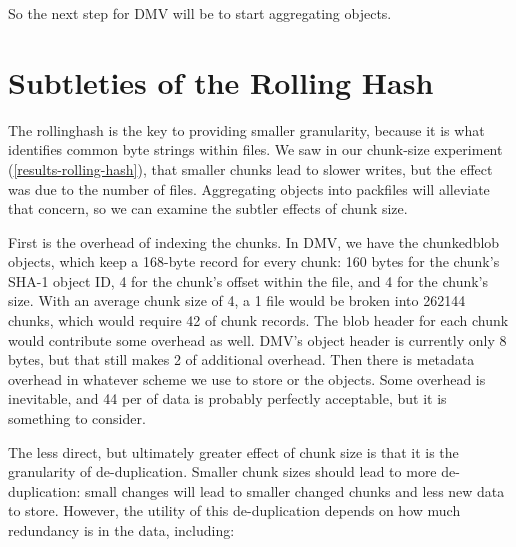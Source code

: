 So the next step for \gls{DMV} will be to start aggregating objects.

%


\section{Subtleties of the Rolling Hash}
\label{rolling-hash-subtleties}

The \gls{rollinghash} is the key to providing smaller granularity, because it is
what identifies common byte strings within files. We saw in our chunk-size
experiment (\autoref{results-rolling-hash}), that smaller chunks lead to slower
writes, but the effect was due to the number of files. Aggregating objects into
\glspl{packfile} will alleviate that concern, so we can examine the subtler
effects of chunk size.

\label{chunk-size-overhead-discussion}

First is the overhead of indexing the chunks. In DMV, we have the
\gls{chunkedblob} objects, which keep a \num{168}-byte record for every chunk:
\num{160} bytes for the chunk's SHA-1 object ID, \num{4} for the chunk's offset
within the file, and \num{4} for the chunk's size\footnotemark. With an average
chunk size of \SI{4}{\kib}, a \SI{1}{\gib} file would be broken into
\num{262144} chunks, which would require \SI{42}{\mib} of chunk records. The
blob header for each chunk would contribute some overhead as well. DMV's object
header is currently only \num{8} bytes, but that still makes \SI{2}{\mib} of
additional overhead. Then there is metadata overhead in whatever scheme we use
to store or  the objects. Some overhead is inevitable,
and \SI{44}{\mib} per \si{\gib} of data is probably perfectly acceptable, but it
is something to consider.


The less direct, but ultimately greater effect of chunk size is that it is the
granularity of de-duplication. Smaller chunk sizes should lead to more
de-duplication: small changes will lead to smaller changed chunks and less new
data to store. However, the utility of this de-duplication depends on how much
redundancy is in the data, including:

